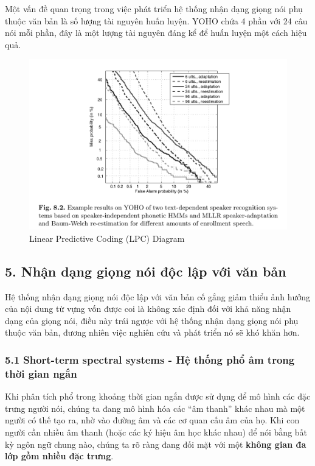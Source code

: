 \documentclass{article}
\begin{document}
	Một vấn đề quan trọng trong việc phát triển hệ thống nhận dạng giọng nói phụ thuộc văn bản là số lượng tài nguyên huấn luyện. YOHO chứa 4 phần với 24 câu nói mỗi phần, đây là một lượng tài nguyên đáng kể để huấn luyện một cách hiệu quả.
	
	\begin{figure}[H]
		\centering
		\includegraphics[width=1\linewidth]{images/figure_8_2.png}
		\caption{Linear Predictive Coding (LPC) Diagram}
		\label{fig:writing-thesis}
	\end{figure}
		
	\subsection{5. Nhận dạng giọng nói độc lập với văn bản}
	\qquad Hệ thống nhận dạng giọng nói độc lập với văn bản cố gắng giảm thiểu ảnh hưởng của nội dung từ vựng vốn được coi là không xác định đối với khả năng nhận dạng của giọng nói, điều này trái ngược với hệ thống nhận dạng giọng nói phụ thuộc văn bản, đương nhiên việc nghiên cứu và phát triển nó sẽ khó khăn hơn.
	
	\subsubsection{5.1 Short-term spectral systems - Hệ thống phổ âm trong thời gian ngắn}
	\qquad Khi phân tích phổ trong khoảng thời gian ngắn được sử dụng để mô hình các đặc trưng người nói, chúng ta đang mô hình hóa các “âm thanh” khác nhau mà một người có thế tạo ra, nhờ vào đường âm và các cơ quan cấu âm của họ. Khi con người cần nhiều âm thanh (hoặc các ký hiệu âm học khác nhau) để nói bằng bất kỳ ngôn ngữ chung nào, chúng ta rõ ràng đang đối mặt với một \textbf{không gian đa lớp gồm nhiều đặc trưng}.
	
\end{document}
